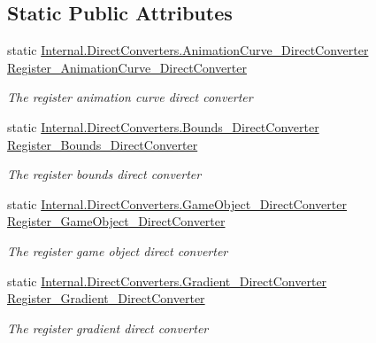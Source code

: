 \subsection*{Static Public Attributes}
\begin{DoxyCompactItemize}
\item 
static \hyperlink{class_full_serializer_1_1_internal_1_1_direct_converters_1_1_animation_curve___direct_converter}{Internal.\+Direct\+Converters.\+Animation\+Curve\+\_\+\+Direct\+Converter} \hyperlink{class_full_serializer_1_1fs_converter_registrar_a5a1deb9741810cdec343a6ce0efb73a3}{Register\+\_\+\+Animation\+Curve\+\_\+\+Direct\+Converter}
\begin{DoxyCompactList}\small\item\em The register animation curve direct converter \end{DoxyCompactList}\item 
static \hyperlink{class_full_serializer_1_1_internal_1_1_direct_converters_1_1_bounds___direct_converter}{Internal.\+Direct\+Converters.\+Bounds\+\_\+\+Direct\+Converter} \hyperlink{class_full_serializer_1_1fs_converter_registrar_a2a349214c9fa67680eb9f59a02c2c0a8}{Register\+\_\+\+Bounds\+\_\+\+Direct\+Converter}
\begin{DoxyCompactList}\small\item\em The register bounds direct converter \end{DoxyCompactList}\item 
static \hyperlink{class_full_serializer_1_1_internal_1_1_direct_converters_1_1_game_object___direct_converter}{Internal.\+Direct\+Converters.\+Game\+Object\+\_\+\+Direct\+Converter} \hyperlink{class_full_serializer_1_1fs_converter_registrar_a80be0ea4830b55c0515daed222760c9d}{Register\+\_\+\+Game\+Object\+\_\+\+Direct\+Converter}
\begin{DoxyCompactList}\small\item\em The register game object direct converter \end{DoxyCompactList}\item 
static \hyperlink{class_full_serializer_1_1_internal_1_1_direct_converters_1_1_gradient___direct_converter}{Internal.\+Direct\+Converters.\+Gradient\+\_\+\+Direct\+Converter} \hyperlink{class_full_serializer_1_1fs_converter_registrar_afc9cb33054876efd305dc172af2ee085}{Register\+\_\+\+Gradient\+\_\+\+Direct\+Converter}
\begin{DoxyCompactList}\small\item\em The register gradient direct converter \end{DoxyCompactList}\item 

\end{DoxyCompactItemize}
